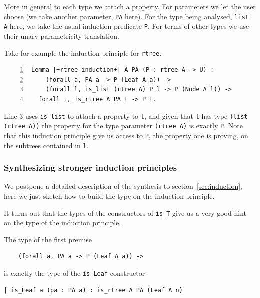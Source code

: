 \documentclass[sigplan,10pt,review]{acmart}\settopmatter{printfolios=true,printccs=false,printacmref=false}
\begin{document}
More in general to each type we attach a property. For parameters we
let the user choose (we take another parameter, \lstinline+PA+ here).
For the type being analysed, \lstinline+list A+ here, we take the
usual induction predicate \lstinline+P+.
For terms of other types we use their unary parametricity translation.

Take for example the induction principle for \lstinline+rtree+.

\begin{minipage}{\textwidth}\begin{lstlisting}[numbers=left]
Lemma |+rtree_induction+| A PA (P : rtree A -> U) :
    (forall a, PA a -> P (Leaf A a)) ->
    (forall l, is_list (rtree A) P l -> P (Node A l)) ->
  forall t, is_rtree A PA t -> P t.
\end{lstlisting}\end{minipage}

\noindent
Line 3 uses \lstinline+is_list+ to attach a property to \lstinline+l+,
and given that \lstinline+l+ has type \lstinline+(list (rtree A))+
the property for the type parameter \lstinline+(rtree A)+ is
exactly \lstinline+P+.
Note that this induction principle give us access to \lstinline+P+, the
property one is proving, on the subtrees contained in \lstinline+l+.

\subsubsection{Synthesizing stronger induction principles} %

We postpone a detailed description of the synthesis to
section~\ref{sec:induction}, here we just sketch how to
build the type on the induction principle.

It turns out that the types of the constructors of
\lstinline+is_T+ give us a very good hint on the type
of the induction principle.

The type of the first premise

\begin{minipage}{\textwidth}\begin{lstlisting}
    (forall a, PA a -> P (Leaf A a)) ->
\end{lstlisting}\end{minipage}

\noindent
is exactly the type of the \lstinline+is_Leaf+ constructor

\begin{minipage}{\textwidth}\begin{lstlisting}
| is_Leaf a (pa : PA a) : is_rtree A PA (Leaf A n)
\end{lstlisting}\end{minipage}
\end{document}
